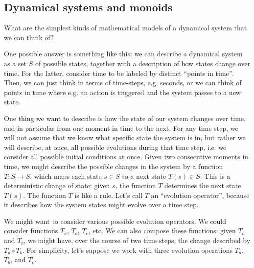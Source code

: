 \subsection{Dynamical systems and monoids}


What are the simplest kinds of mathematical models of a dynamical system that we can think of? 

One possible answer is something like this: we can describe a dynamical system as a set $S$ of possible states, together with a description of how states change over time. For the latter, consider time to be labeled by distinct ``points in time''. Then, we can just think in terms of time-steps, e.g. seconds, or we can think of points in time where e.g. an action is triggered and the system passes to a new state. 

One thing we want to describe is how the state of our system changes over time, and in particular from one moment in time to the next. For any time step, we will not assume that we know what specific state the system is in, but rather we will describe, at once, all possible evolutions during that time step, i.e. we consider all possible initial conditions at once. Given two consecutive moments in time, we might describe the possible changes in the system by a function $T : S \rightarrow S$, which maps each state $s \in S$ to a next state $T(s) \in S$. This is a deterministic change of state: given $s$, the function $T$ determines the next state $T(s)$. The function $T$ is like a rule. Let's call $T$ an ``evolution operator'', because it describes how the system states might evolve over a time step. 

We might want to consider various possible evolution operators. We could consider functions $T_a$, $T_b$, $T_c$, etc. We can also compose these functions: given $T_a$ and $T_b$, we might have, over the course of two time steps, the change described by $T_a \circ T_b$. For simplicity, let's suppose we work with three evolution operations $T_a$, $T_b$, and $T_c$.

\


\








